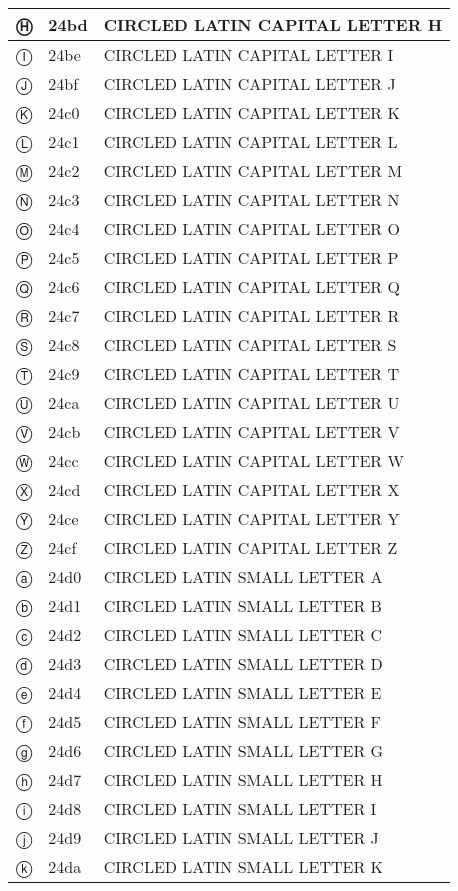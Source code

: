 \documentclass[12pt,letterpaper,openany]{book}
\begin{document}
\begin{center}
\begin{supertabular}{|m{0.25in}|m{0.5in}|m{4in}|}
Ⓗ & 24bd & CIRCLED LATIN CAPITAL LETTER H\\\hline
Ⓘ & 24be & CIRCLED LATIN CAPITAL LETTER I\\\hline
Ⓙ & 24bf & CIRCLED LATIN CAPITAL LETTER J\\\hline
Ⓚ & 24c0 & CIRCLED LATIN CAPITAL LETTER K\\\hline
Ⓛ & 24c1 & CIRCLED LATIN CAPITAL LETTER L\\\hline
Ⓜ & 24c2 & CIRCLED LATIN CAPITAL LETTER M\\\hline
Ⓝ & 24c3 & CIRCLED LATIN CAPITAL LETTER N\\\hline
Ⓞ & 24c4 & CIRCLED LATIN CAPITAL LETTER O\\\hline
Ⓟ & 24c5 & CIRCLED LATIN CAPITAL LETTER P\\\hline
Ⓠ & 24c6 & CIRCLED LATIN CAPITAL LETTER Q\\\hline
Ⓡ & 24c7 & CIRCLED LATIN CAPITAL LETTER R\\\hline
Ⓢ & 24c8 & CIRCLED LATIN CAPITAL LETTER S\\\hline
Ⓣ & 24c9 & CIRCLED LATIN CAPITAL LETTER T\\\hline
Ⓤ & 24ca & CIRCLED LATIN CAPITAL LETTER U\\\hline
Ⓥ & 24cb & CIRCLED LATIN CAPITAL LETTER V\\\hline
Ⓦ & 24cc & CIRCLED LATIN CAPITAL LETTER W\\\hline
Ⓧ & 24cd & CIRCLED LATIN CAPITAL LETTER X\\\hline
Ⓨ & 24ce & CIRCLED LATIN CAPITAL LETTER Y\\\hline
Ⓩ & 24cf & CIRCLED LATIN CAPITAL LETTER Z\\\hline
ⓐ & 24d0 & CIRCLED LATIN SMALL LETTER A\\\hline
ⓑ & 24d1 & CIRCLED LATIN SMALL LETTER B\\\hline
ⓒ & 24d2 & CIRCLED LATIN SMALL LETTER C\\\hline
ⓓ & 24d3 & CIRCLED LATIN SMALL LETTER D\\\hline
ⓔ & 24d4 & CIRCLED LATIN SMALL LETTER E\\\hline
ⓕ & 24d5 & CIRCLED LATIN SMALL LETTER F\\\hline
ⓖ & 24d6 & CIRCLED LATIN SMALL LETTER G\\\hline
ⓗ & 24d7 & CIRCLED LATIN SMALL LETTER H\\\hline
ⓘ & 24d8 & CIRCLED LATIN SMALL LETTER I\\\hline
ⓙ & 24d9 & CIRCLED LATIN SMALL LETTER J\\\hline
ⓚ & 24da & CIRCLED LATIN SMALL LETTER K\\\hline

\end{supertabular}
\end{center}
\end{document}
